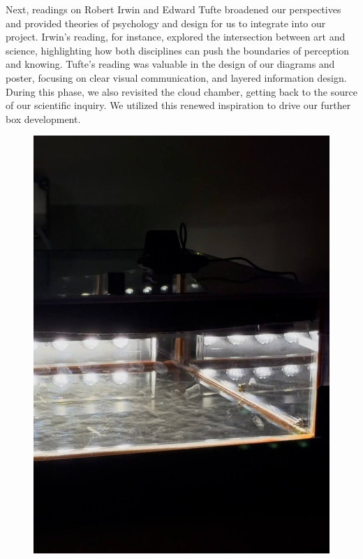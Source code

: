 \documentclass{article}
\begin{document}
Next, readings on Robert Irwin and Edward Tufte broadened our perspectives and provided theories of psychology and design for us to integrate into our project. Irwin’s reading, for instance, explored the intersection between art and science, highlighting how both disciplines can push the boundaries of perception and knowing. Tufte’s reading was valuable in the design of our diagrams and poster, focusing on clear visual communication, and layered information design. During this phase, we also revisited the cloud chamber, getting back to the source of our scientific inquiry. We utilized this renewed inspiration to drive our further box development. 

\begin{figure} [h]
    \centering
  \begin{minipage}[b]{0.25\textwidth}
    \includegraphics[width=\textwidth]{images/unnamed7.jpg}
  \end{minipage}

\end{figure}
\end{document}
